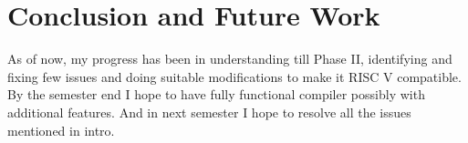 \chapter{Conclusion and Future Work}

As of now, my progress has been in understanding till Phase II, identifying and fixing few issues and doing suitable modifications to make it RISC V compatible. By the semester end I hope to have fully functional compiler possibly with additional features. And in next semester I hope to resolve all the issues mentioned in intro. 
